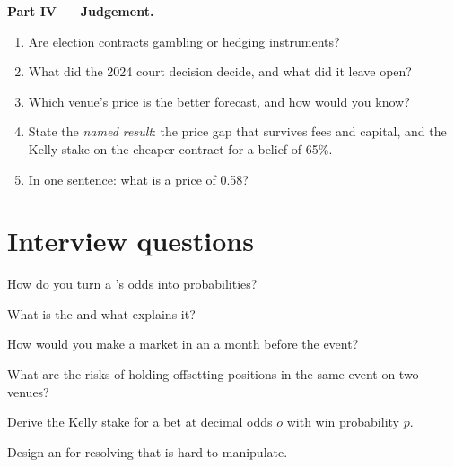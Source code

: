 \begin{problem}
\medskip\noindent\textbf{Part IV --- Judgement.}
\begin{enumerate}[resume]
\item Are election contracts gambling or hedging instruments?
\item What did the 2024 court decision decide, and what did it leave open?
\item Which venue's price is the better forecast, and how would you know?
\item State the \emph{named result}: the price gap that survives fees and capital, and the Kelly stake on the cheaper contract for a belief of 65\%.
\item In one sentence: what is a price of 0.58?
\end{enumerate}
\end{problem}

\section{Interview questions}

\begin{interviewq}\label{iq:m3:prediction-and-betting-markets:1}
How do you turn a 's odds into probabilities?
\end{interviewq}

\begin{interviewq}\label{iq:m3:prediction-and-betting-markets:2}
What is the  and what explains it?
\end{interviewq}

\begin{interviewq}\label{iq:m3:prediction-and-betting-markets:3}
How would you make a market in an  a month before the event?
\end{interviewq}

\begin{interviewq}\label{iq:m3:prediction-and-betting-markets:4}
What are the risks of holding offsetting positions in the same event on two venues?
\end{interviewq}

\begin{interviewq}\label{iq:m3:prediction-and-betting-markets:5}
Derive the Kelly stake for a bet at decimal odds $o$ with win probability $p$.
\end{interviewq}

\begin{interviewq}\label{iq:m3:prediction-and-betting-markets:6}
Design an  for resolving  that is hard to manipulate.
\end{interviewq}

